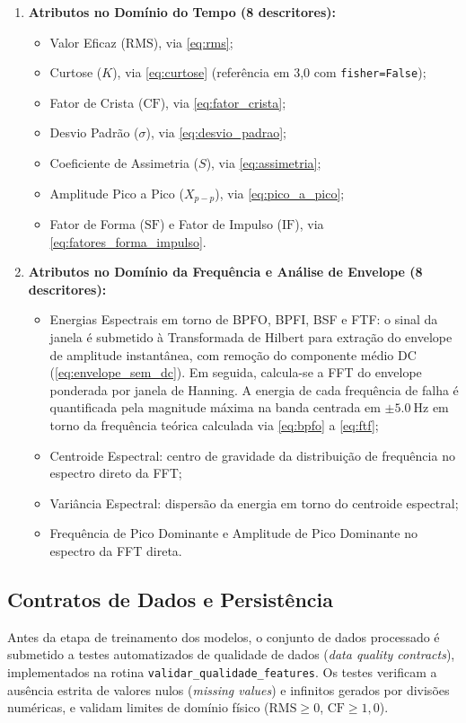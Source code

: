 \begin{enumerate}
    \item \textbf{Atributos no Domínio do Tempo (8 descritores):}
    \begin{itemize}
        \item Valor Eficaz ($\text{RMS}$), via \autoref{eq:rms};
        \item Curtose ($K$), via \autoref{eq:curtose} (referência em 3,0 com \texttt{fisher=False});
        \item Fator de Crista ($\text{CF}$), via \autoref{eq:fator_crista};
        \item Desvio Padrão ($\sigma$), via \autoref{eq:desvio_padrao};
        \item Coeficiente de Assimetria ($S$), via \autoref{eq:assimetria};
        \item Amplitude Pico a Pico ($X_{p-p}$), via \autoref{eq:pico_a_pico};
        \item Fator de Forma ($\text{SF}$) e Fator de Impulso ($\text{IF}$), via \autoref{eq:fatores_forma_impulso}.
    \end{itemize}
    \item \textbf{Atributos no Domínio da Frequência e Análise de Envelope (8 descritores):}
    \begin{itemize}
        \item Energias Espectrais em torno de BPFO, BPFI, BSF e FTF: o sinal da janela é submetido à Transformada de Hilbert para extração do envelope de amplitude instantânea, com remoção do componente médio DC (\autoref{eq:envelope_sem_dc}). Em seguida, calcula-se a FFT do envelope ponderada por janela de Hanning. A energia de cada frequência de falha é quantificada pela magnitude máxima na banda centrada em $\pm \SI{5,0}{\hertz}$ em torno da frequência teórica calculada via \autoref{eq:bpfo} a \ref{eq:ftf};
        \item Centroide Espectral: centro de gravidade da distribuição de frequência no espectro direto da FFT;
        \item Variância Espectral: dispersão da energia em torno do centroide espectral;
        \item Frequência de Pico Dominante e Amplitude de Pico Dominante no espectro da FFT direta.
    \end{itemize}
\end{enumerate}

\subsection{Contratos de Dados e Persistência}
Antes da etapa de treinamento dos modelos, o conjunto de dados processado é submetido a testes automatizados de qualidade de dados (\textit{data quality contracts}), implementados na rotina \texttt{validar\_qualidade\_features}. Os testes verificam a ausência estrita de valores nulos (\textit{missing values}) e infinitos gerados por divisões numéricas, e validam limites de domínio físico ($\text{RMS} \ge 0$, $\text{CF} \ge 1,0$).

